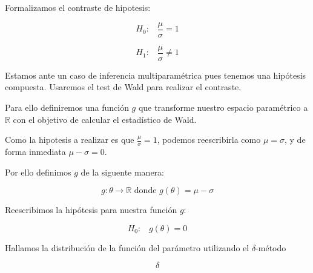 Formalizamos el contraste de hipotesis:

\[
    H_0\text{:}\quad \frac{\mu}{\sigma} = 1
\]

\[
    H_1\text{:}\quad \frac{\mu}{\sigma} \neq 1
\]

Estamos ante un caso de inferencia multiparamétrica pues tenemos una hipótesis compuesta. Usaremos el test de Wald para realizar el contraste.

Para ello definiremos una función $g$ que transforme nuestro espacio paramétrico a $\mathbb{R}$ con el objetivo de calcular
el estadístico de Wald.


Como la hipotesis a realizar es que $\frac{\mu}{\sigma} = 1$, podemos reescribirla como $\mu = \sigma$, y de forma inmediata $\mu - \sigma = 0$.

Por ello definimos $g$ de la siguente manera:

\[
    g: \theta \longrightarrow \mathbb{R} \text{ donde } g(\theta) = \mu - \sigma
\]

Reescribimos la hipótesis para nuestra función $g$:

\[
    H_0\text{:}\quad g(\theta) = 0
\]

\newpage

Hallamos la distribución de la función del parámetro utilizando el $\delta$-método

\[
    \delta
\]
